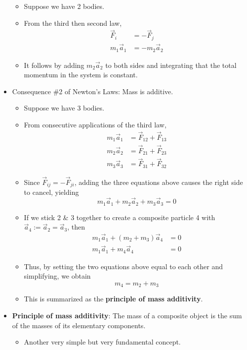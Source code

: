 \documentclass[../notes.tex]{subfiles}
\begin{document}
\begin{itemize}
\begin{itemize}
        \item Suppose we have 2 bodies.
        \item From the third then second law,
        \begin{align*}
            \vec{F}_i &= -\vec{F}_j\\
            m_1\vec{a}_1 &= -m_2\vec{a}_2
        \end{align*}
        \item It follows by adding $m_2\vec{a}_2$ to both sides and integrating that the total momentum in the system is constant.
    \end{itemize}
    \item Consequence \#2 of Newton's Laws: Mass is additive.
    \begin{itemize}
        \item Suppose we have 3 bodies.
        \item From consecutive applications of the third law,
        \begin{align*}
            m_1\vec{a}_1 &= \vec{F}_{12}+\vec{F}_{13}\\
            m_2\vec{a}_2 &= \vec{F}_{21}+\vec{F}_{23}\\
            m_3\vec{a}_3 &= \vec{F}_{31}+\vec{F}_{32}
        \end{align*}
        \item Since $\vec{F}_{ij}=-\vec{F}_{ji}$, adding the three equations above causes the right side to cancel, yielding
        \begin{equation*}
            m_1\vec{a}_1+m_2\vec{a}_2+m_3\vec{a}_3 = 0
        \end{equation*}
        \item If we stick 2 \& 3 together to create a composite particle 4 with $\vec{a}_4:=\vec{a}_2=\vec{a}_3$, then
        \begin{align*}
            m_1\vec{a}_1+(m_2+m_3)\vec{a}_4 &= 0\\
            m_1\vec{a}_1+m_4\vec{a}_4 &= 0
        \end{align*}
        \item Thus, by setting the two equations above equal to each other and simplifying, we obtain
        \begin{equation*}
            m_4 = m_2+m_3
        \end{equation*}
        \item This is summarized as the \textbf{principle of mass additivity}.
    \end{itemize}
    \item \textbf{Principle of mass additivity}: The mass of a composite object is the sum of the masses of its elementary components.
    \begin{itemize}
        \item Another very simple but very fundamental concept.
    \end{itemize}
\end{itemize}
\end{document}
